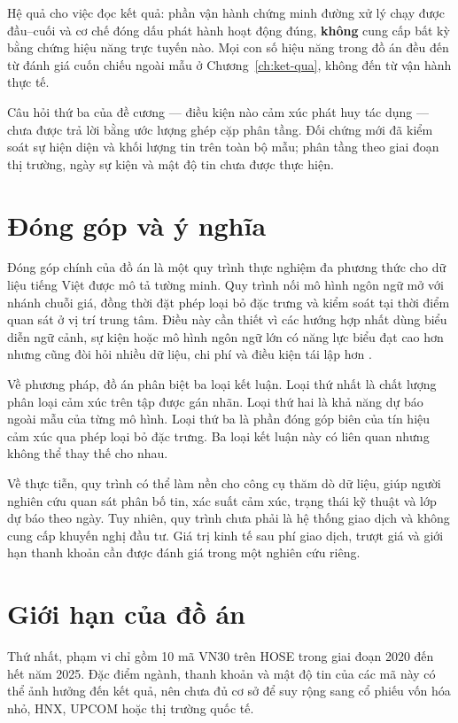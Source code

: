 Hệ quả cho việc đọc kết quả: phần vận hành chứng minh đường xử lý chạy được đầu--cuối và cơ
chế đóng dấu phát hành hoạt động đúng, \textbf{không} cung cấp bất kỳ bằng chứng hiệu năng
trực tuyến nào. Mọi con số hiệu năng trong đồ án đều đến từ đánh giá cuốn chiếu ngoài mẫu ở
Chương~\ref{ch:ket-qua}, không đến từ vận hành thực tế.

Câu hỏi thứ ba của đề cương --- điều kiện nào cảm xúc phát huy tác dụng --- chưa được trả
lời bằng ước lượng ghép cặp phân tầng. Đối chứng mới đã kiểm soát sự hiện diện và khối
lượng tin trên toàn bộ mẫu; phân tầng theo giai đoạn thị trường, ngày sự kiện và mật độ tin
chưa được thực hiện.

\section{Đóng góp và ý nghĩa}

Đóng góp chính của đồ án là một quy trình thực nghiệm đa phương thức cho dữ liệu tiếng
Việt được mô tả tường minh. Quy trình nối mô hình ngôn ngữ mở với nhánh chuỗi giá, đồng
thời đặt phép loại bỏ đặc trưng và kiểm soát tại thời điểm quan sát ở vị trí trung tâm.
Điều này cần thiết vì các hướng hợp nhất dùng biểu diễn ngữ cảnh, sự kiện hoặc mô hình
ngôn ngữ lớn có năng lực biểu đạt cao hơn nhưng cũng đòi hỏi nhiều dữ liệu, chi phí và
điều kiện tái lập hơn \cite{Chen2021_210708721v1,Elahi2024_241101368v1,Liang2024_241210823v2}.

Về phương pháp, đồ án phân biệt ba loại kết luận. Loại thứ nhất là chất lượng phân loại
cảm xúc trên tập được gán nhãn. Loại thứ hai là khả năng dự báo ngoài mẫu của từng mô
hình. Loại thứ ba là phần đóng góp biên của tín hiệu cảm xúc qua phép loại bỏ đặc trưng.
Ba loại kết luận này có liên quan nhưng không thể thay thế cho nhau.

Về thực tiễn, quy trình có thể làm nền cho công cụ thăm dò dữ liệu, giúp người nghiên cứu
quan sát phân bố tin, xác suất cảm xúc, trạng thái kỹ thuật và lớp dự báo theo ngày. Tuy
nhiên, quy trình chưa phải là hệ thống giao dịch và không cung cấp khuyến nghị đầu tư.
Giá trị kinh tế sau phí giao dịch, trượt giá và giới hạn thanh khoản cần được đánh giá
trong một nghiên cứu riêng.

\section{Giới hạn của đồ án}

Thứ nhất, phạm vi chỉ gồm 10 mã VN30 trên HOSE trong giai đoạn 2020 đến hết năm 2025.
Đặc điểm ngành, thanh khoản và mật độ tin của các mã này có thể ảnh hưởng đến kết quả,
nên chưa đủ cơ sở để suy rộng sang cổ phiếu vốn hóa nhỏ, HNX, UPCOM hoặc thị trường
quốc tế.

